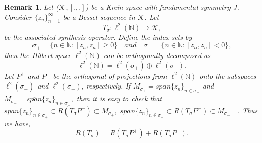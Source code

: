 \documentclass[article,12pt]{amsart}
\newtheorem{defn}[thm]{Definition}
\newtheorem{rem}[thm]{Remark}
\begin{document}
\begin{rem}\label{rem}
	Let ($\mathcal{K}, [., .]$) be a Krein space with fundamental symmetry $J$. Consider $\{z_n\}^\infty_{n = 1}$ be a Bessel sequence in $\mathcal{K}$. Let 
	$$T_{\sigma}: \ell^2(\mathbb N)\rightarrow \mathcal{K},$$ be the associated synthesis operator. Define the index sets by 
	$$\sigma_+ =\{n \in\mathbb{N} : [z_n, z_n]\geq0\}\quad and\quad \sigma_- =\{n \in\mathbb{N} : [z_n, z_n]< 0\},$$ then the Hilbert space $\ell^2(\mathbb N)$ can be orthogonally decomposed as 
	$$\ell^2(\mathbb N) = \ell^2(\sigma_+) \oplus \ell^2(\sigma_-).$$
	Let $P^+$ and $P^-$ be the orthogonal of projections from $\ell^2(\mathbb N)$ onto the subspaces $\ell^2(\sigma_+)$ and $\ell^2(\sigma_-)$, respectively. If $M_{\sigma_+} = \overline{span} \{z_n\}_{n \in \sigma_+}$ and $M_{\sigma_-} = \overline{span} \{z_n\}_{n \in \sigma_-},$
	then it is easy to check that $\overline{span} \{z_n\}_{n \in \sigma_+} \subset R(T_{\sigma}P^+) \subset M_{\sigma_+},$
	$\overline{span} \{z_n\}_{n \in \sigma_-} \subset R(T_{\sigma}P^-) \subset M_{\sigma_-} \quad.$ Thus we have, 
	$$R(T_\sigma )= R(T_{\sigma}P^+) +R(T_{\sigma}P^-).$$ 
	
\end{rem}

	
	
	
	 
\end{document}
